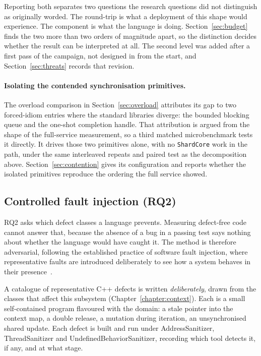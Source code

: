\documentclass[english,twoside,openright,a4paper,censored,csm,software-track-2020]{HYthesisML}
\begin{document}
Reporting both separates two questions the research questions did not distinguish as originally
worded. The round-trip is what a deployment of this shape would experience. The component is
what the language is doing. Section~\ref{sec:budget} finds the two more than two orders of
magnitude apart, so the distinction decides whether the result can be interpreted at all. The
second level was added after a first pass of the campaign, not designed in from the start, and
Section~\ref{sec:threats} records that revision.

\paragraph{Isolating the contended synchronisation primitives.}
The overload comparison in Section~\ref{sec:overload} attributes its gap to two forced-idiom
entries where the standard libraries diverge: the bounded blocking queue and the one-shot
completion handle. That attribution is argued from the shape of the full-service measurement, so
a third matched microbenchmark tests it directly. It drives those two primitives alone, with no
\texttt{ShardCore} work in the path, under the same interleaved repeats and paired test as the
decomposition above. Section~\ref{sec:contention} gives its configuration and reports whether the
isolated primitives reproduce the ordering the full service showed.

\subsection{Controlled fault injection (RQ2)}\label{sec:methodfaults}
RQ2 asks which defect classes a language prevents. Measuring defect-free code cannot answer
that, because the absence of a bug in a passing test says nothing about whether the language
would have caught it. The method is therefore adversarial, following the established practice of
software fault injection, where representative faults are introduced deliberately to see how a
system behaves in their presence~\cite{natella2016fault}.

A catalogue of representative C++ defects is written \emph{deliberately}, drawn from the classes
that affect this subsystem (Chapter~\ref{chapter:context}). Each is a small self-contained
program flavoured with the domain: a stale pointer into the context map, a double release, a
mutation during iteration, an unsynchronised shared update. Each defect is built and run under
AddressSanitizer, ThreadSanitizer and UndefinedBehaviorSanitizer, recording which tool detects
it, if any, and at what stage.
\end{document}
